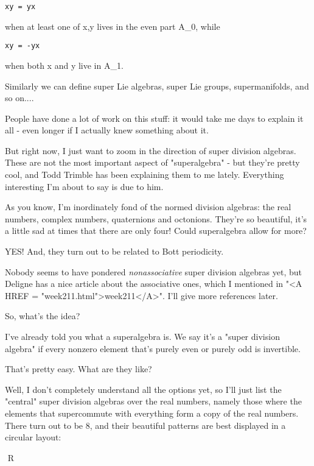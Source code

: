 \begin{verbatim}
xy = yx
\end{verbatim}
    
when at least one of x,y lives in the even part A_{0}, while 

\begin{verbatim}
xy = -yx
\end{verbatim}
    
when both x and y live in A_{1}.   

Similarly we can define super Lie algebras, super Lie groups, 
supermanifolds, and so on.... 

People have done a lot of work on this stuff: it would take me days to 
explain it all - even longer if I actually knew something about it.  

But right now, I just want to zoom in the direction of super division 
algebras.  These are not the most important aspect of 
"superalgebra" - 
but they're pretty cool, and Todd Trimble has been explaining them to
me lately.  Everything interesting I'm about to say is due to him.

As you know, I'm inordinately fond of the normed division algebras:
the real numbers, complex numbers, quaternions and octonions.  They're
so beautiful, it's a little sad at times that there are only four!
Could superalgebra allow for more?

YES!  And, they turn out to be related to Bott periodicity.

Nobody seems to have pondered \emph{nonassociative} super division algebras 
yet, but Deligne has a nice article about the associative ones, which
I mentioned in "<A HREF = "week211.html">week211</A>".  I'll 
give more references later.

So, what's the idea?

I've already told you what a superalgebra is.  We say it's a "super 
division algebra" if every nonzero element that's purely even or 
purely odd is invertible.  

That's pretty easy.  What are they like?  

Well, I don't completely understand all the options yet, so I'll
just list the "central" super division algebras over the 
real numbers, 
namely those where the elements that supercommute with everything
form a copy of the real numbers.  There turn out to be 8, and their
beautiful patterns are best displayed in a circular layout:


$$
                                   R

